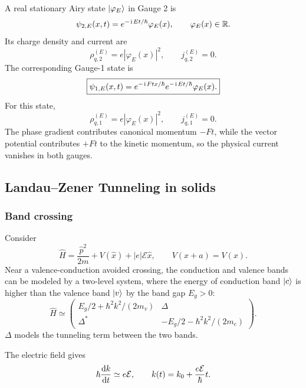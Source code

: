 A real stationary Airy state $|{\varphi_E}\rangle$ in Gauge 2 is
\begin{equation}
 \psi_{2,E}(x,t)=e^{-\hspace{1pt}\mathrm{i}\hspace{1pt} Et/\hbar}\varphi_E(x),
 \qquad \varphi_E(x)\in\mathbb R.
\end{equation}
Its charge density and current are
\begin{equation}
 \rho_{q,2}^{(E)}=e|\varphi_E(x)|^2,
 \qquad
 \boxed{j_{q,2}^{(E)}=0.}
\end{equation}
The corresponding Gauge-1 state is
\begin{equation}
 \boxed{
 \psi_{1,E}(x,t)=e^{-\hspace{1pt}\mathrm{i}\hspace{1pt} Ftx/\hbar}
 e^{-\hspace{1pt}\mathrm{i}\hspace{1pt} Et/\hbar}\varphi_E(x).}
\end{equation}
For this state,
\begin{equation}
 \rho_{q,1}^{(E)}=e|\varphi_E(x)|^2,
 \qquad
 \boxed{j_{q,1}^{(E)}=0.}
\end{equation}
The phase gradient contributes canonical momentum $-Ft$, while the vector
potential contributes $+Ft$ to the kinetic momentum, so the physical current
vanishes in both gauges.

\subsection{Landau--Zener Tunneling in solids}

\subsubsection{Band crossing}
Consider
\begin{equation}
\hat H=\frac{\hat p^2}{2m}+V(\hat x)+|e|\mathcal E\hat x,
\qquad
V(x+a)=V(x).
\end{equation}
Near a valence-conduction avoided crossing, the conduction and valence bands can be modeled by a two-level system, where the energy of conduction band $|{c}\rangle$ is higher than the valence band $|{v}\rangle$ by the band gap $E_g>0$:
\begin{equation}
\hat H\simeq
\begin{pmatrix}
E_g/2+\hbar^2k^2/(2m_v)&\Delta\\
\Delta^*&-E_g/2-\hbar^2k^2/(2m_c)
\end{pmatrix}.
\end{equation}
$\Delta$ models the tunneling term between the two bands. 

The electric field gives
\begin{equation}
\hbar\frac{\mathrm{d} k}{\mathrm{d} t}\simeq e\mathcal E,
\qquad
k(t)=k_0+\frac{e\mathcal E}{\hbar}t.
\end{equation}

